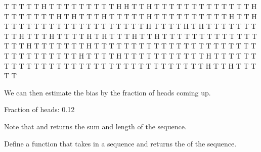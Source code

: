 \documentclass[letterpaper,10pt,english]{sphinxmanual}
\begin{document}
\begin{sphinxVerbatim}[commandchars=\\\{\}]
T T T T T H T T T T T T T T T H H T T H T T T T T T T T T T T T T H T T T T T T T H T H T T T H T T T T T H T T T T T T T T T T H T T H T T T T T T T T T T T T T T T T T T T H T T T T H T H T T T T T T T T T H T T T H T T T T H T H T T T H T T H T T T T T T T T T T T T T T T T H T T T T T T T H T T T T T T T T T T T T T T T T T T T T T T T T T T T T T T T T H T T T T H T T T T T T T T T T T H T T T T T T T T T T T T T T T T T T T T T T T T T T T T T T T T T H T T H T T T T T
\end{sphinxVerbatim}

We can then estimate the bias by the fraction of heads coming up.

\begin{sphinxVerbatim}[commandchars=\\\{\}]
 
     

  \PYG{p}{[}          \PYG{p}{]}
  
 
\end{sphinxVerbatim}

\begin{sphinxVerbatim}[commandchars=\\\{\}]
Fraction of heads: 0.12
\end{sphinxVerbatim}

Note that  and  returns the sum and length of the sequence.

 Define a function  that takes in a sequence  and returns the  of the sequence.
\end{document}
